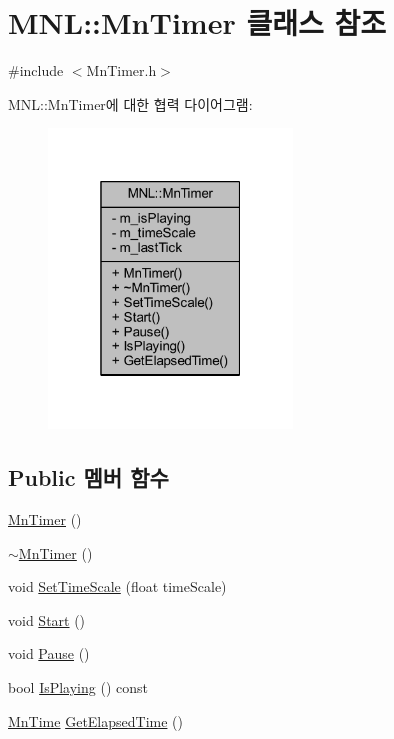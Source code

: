 \hypertarget{class_m_n_l_1_1_mn_timer}{}\section{M\+NL\+:\+:Mn\+Timer 클래스 참조}
\label{class_m_n_l_1_1_mn_timer}


{\ttfamily \#include $<$Mn\+Timer.\+h$>$}



M\+NL\+:\+:Mn\+Timer에 대한 협력 다이어그램\+:\nopagebreak
\begin{figure}[H]
\begin{center}
\leavevmode
\includegraphics[width=184pt]{class_m_n_l_1_1_mn_timer__coll__graph}
\end{center}
\end{figure}
\subsection*{Public 멤버 함수}
\begin{DoxyCompactItemize}
\item 
\hyperlink{class_m_n_l_1_1_mn_timer_aee4e048c674d82feeaadfad258ed0a5b}{Mn\+Timer} ()
\item 
\hyperlink{class_m_n_l_1_1_mn_timer_a97457692c75d5d249d2ad2bc28f2ecc4}{$\sim$\+Mn\+Timer} ()
\item 
void \hyperlink{class_m_n_l_1_1_mn_timer_af6f75413128d2a40e00e1a07567cf0d6}{Set\+Time\+Scale} (float time\+Scale)
\item 
void \hyperlink{class_m_n_l_1_1_mn_timer_af165e63d407713a60f43f198ce3e93a8}{Start} ()
\item 
void \hyperlink{class_m_n_l_1_1_mn_timer_ab57c58684ae10509a8ac744683f799e4}{Pause} ()
\item 
bool \hyperlink{class_m_n_l_1_1_mn_timer_ab12fb3c3a420e0d9751326c9bcb7d220}{Is\+Playing} () const
\item 
\hyperlink{class_m_n_l_1_1_mn_time}{Mn\+Time} \hyperlink{class_m_n_l_1_1_mn_timer_a49d983d8b3dd30a5755b0d83e9d9deff}{Get\+Elapsed\+Time} ()
\end{DoxyCompactItemize}
